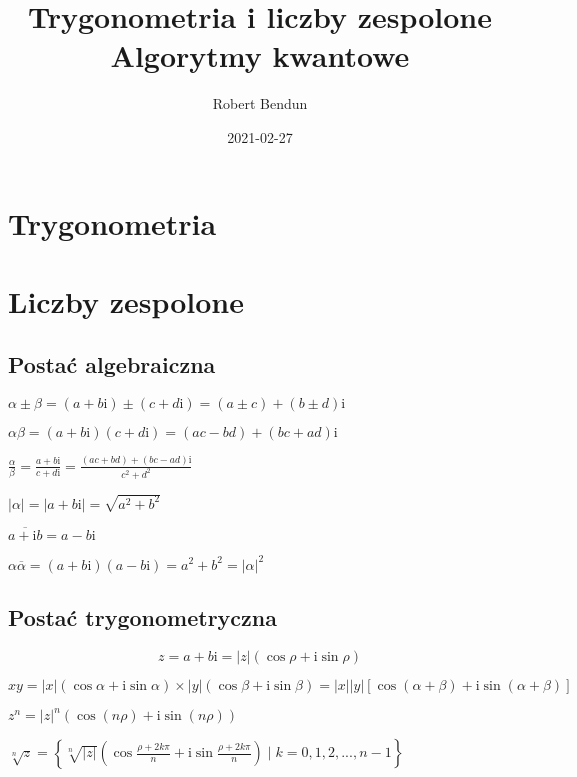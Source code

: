 \documentclass[a5paper,10pt]{article}
\title{Trygonometria i liczby zespolone \\
  \large Algorytmy kwantowe}
\date{2021-02-27}
\author{Robert Bendun}
\newcommand{\mi}{\mathrm{i}}
\begin{document}
\maketitle

\section{Trygonometria}

\section{Liczby zespolone}

\subsection{Postać algebraiczna}
\begin{description}
	\item $ \alpha \pm \beta = \left( a + b\mi \right) \pm \left( c + d\mi \right) 
	= \left( a \pm c \right) + \left( b \pm d \right)\mi$
	\item $ \alpha\beta = \left( a + b\mi \right) \left( c + d\mi \right) 
	= \left( ac - bd \right) + \left( bc + ad \right)\mi$
	\item $ \frac{\alpha}{\beta} = \frac{a + b\mi}{c + d\mi} = \frac{(ac + bd) + (bc - ad)\mi}{c^2 + d^2} $
	\item[Norma] $ |\alpha| = |a + b\mi| = \sqrt{a^2 + b^2} $
	\item[Sprzężenie] $ \overline{a + \mi b} = a - b\mi $
	\item $ \alpha\overline{\alpha} = (a + b\mi)(a - b\mi) = a^2 + b^2 = |\alpha|^2 $
\end{description}

\subsection{Postać trygonometryczna}

$$ z = a + b\mi = |z|(\cos\rho + \mi\sin\rho) $$

\begin{description}

\item $ xy = |x|(\cos \alpha + \mi\sin\alpha) \times |y|(\cos \beta + \mi\sin\beta) =
	|x||y|\left[\cos(\alpha + \beta) + \mi\sin(\alpha+\beta)\right]$

\item[Wzór de Moivre'a] $ z^n = |z|^n\left(\cos(n\rho) + \mi\sin(n\rho)\right) $

\item[Pierwiastki] $ \sqrt[n]{ z } = \left\{ \sqrt[n]{|z|} \left(\cos \frac{\rho + 2k\pi}{n} + \mi\sin \frac{\rho + 2k\pi}{n} \right) \mid k = 0, 1, 2, ..., n-1  \right\} $

\end{description}
\end{document}
